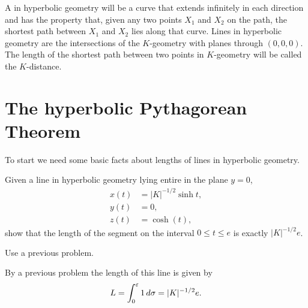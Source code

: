 \documentclass[newpage,hints,handout]{ximera}
\begin{document}
\begin{definition}
A  in hyperbolic geometry will be a curve that extends
infinitely in each direction and has the property that, given any two
points $X_{1}$ and $X_{2}$ on the path, the shortest path between
$X_{1}$ and $X_{2}$ lies along that curve. Lines in hyperbolic
geometry are the intersections of the $K$-geometry with planes through
$(0,0,0)$. The length of the shortest path between two points in
$K$-geometry will be called the $K$-distance.
\end{definition}


\section{The hyperbolic Pythagorean Theorem}

To start we need some basic facts about lengths of lines in hyperbolic
geometry.

\begin{problem}
  Given a line in hyperbolic geometry lying entire in the plane
  $y=0$,
  \begin{align*}
    x(t) &= |K|^{-1/2}\sinh t,\\
    y(t) &= 0,\\
    z(t) &= \cosh(t),
  \end{align*}
  show that the length of the segment on the interval $0 \leq t \leq e$ is
  exactly $|K|^{-1/2}e$.
  \begin{hint}
    Use a previous problem.
  \end{hint}
  \begin{freeResponse}
    By a previous problem the length of this line is given by
    \[
    L=\int_{0}^{\varepsilon} 1 \,d\sigma = |K|^{-1/2}e.
    \]
  \end{freeResponse}
\end{problem}
\end{document}
